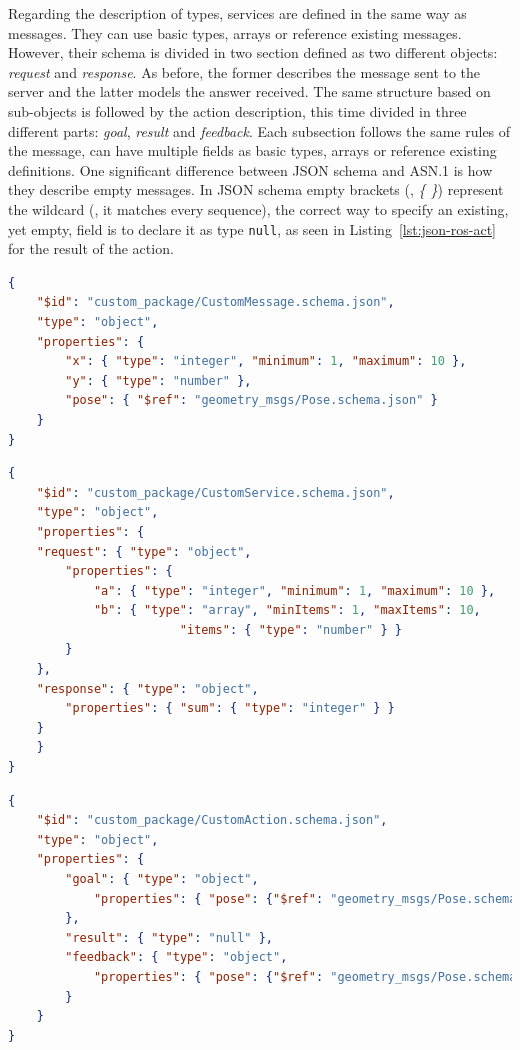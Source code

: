 Regarding the description of types, services are defined in the same way as messages. They can use basic types, arrays or reference existing messages. However, their schema is divided in two section defined as two different objects: \textit{request} and \textit{response}. As before, the former describes the message sent to the server and the latter models the answer received. The same structure based on sub-objects is followed by the action description, this time divided in three different parts: \textit{goal}, \textit{result} and \textit{feedback}. Each subsection follows the same rules of the message, can have multiple fields as basic types, arrays or reference existing definitions. One significant difference between JSON schema and ASN.1 is how they describe empty messages. In JSON schema empty brackets (\ie, \textit{\{ \}}) represent the wildcard (\ie, it matches every sequence), the correct way to specify an existing, yet empty, field is to declare it as type \texttt{null}, as seen in Listing~\ref{lst:json-ros-act} for the result of the action.

\begin{lstlisting}[language=JSON, caption={ROS message definition using JSON schema},label=lst:json-ros-msg]
{
	"$id": "custom_package/CustomMessage.schema.json",
	"type": "object",
	"properties": {
		"x": { "type": "integer", "minimum": 1, "maximum": 10 },
		"y": { "type": "number" },
		"pose": { "$ref": "geometry_msgs/Pose.schema.json" }
	}
}
\end{lstlisting}

\begin{lstlisting}[language=JSON, caption={ROS service definition using JSON schema},label=lst:json-ros-srv]
{
	"$id": "custom_package/CustomService.schema.json",
	"type": "object",
	"properties": {
	"request": { "type": "object",
		"properties": {
			"a": { "type": "integer", "minimum": 1, "maximum": 10 },
			"b": { "type": "array", "minItems": 1, "maxItems": 10,
						"items": { "type": "number" } }
		}
	},
	"response": { "type": "object",
		"properties": { "sum": { "type": "integer" } }
	}
	}
}
\end{lstlisting}

\begin{lstlisting}[language=JSON, caption={ROS action definition using JSON schema},label=lst:json-ros-act]
{
	"$id": "custom_package/CustomAction.schema.json",
	"type": "object",
	"properties": {
		"goal": { "type": "object", 
			"properties": { "pose": {"$ref": "geometry_msgs/Pose.schema.json"} }
		},
		"result": { "type": "null" },
		"feedback": { "type": "object",
			"properties": { "pose": {"$ref": "geometry_msgs/Pose.schema.json"} }
		}
	}
}
\end{lstlisting}

